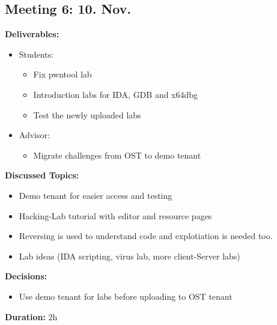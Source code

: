 \newpage
\subsection*{Meeting 6: 10. Nov.}
\textbf{Deliverables:}
\begin{itemize}
    \item Students:
    \begin{itemize}
        \item Fix pwntool lab
        \item Introduction labs for IDA, GDB and x64dbg
        \item Test the newly uploaded labs
    \end{itemize}
    \item Advisor:
    \begin{itemize}
        \item Migrate challenges from OST to demo tenant
    \end{itemize}
\end{itemize} 
\textbf{Discussed Topics:}
\begin{itemize}
    \item Demo tenant for easier access and testing
    \item Hacking-Lab tutorial with editor and resource pages
    \item Reversing is used to understand code and explotiation is needed too.
    \item Lab ideas (IDA scripting, virus lab, more client-Server labs)
\end{itemize}
\textbf{Decisions:}
\begin{itemize}
    \item Use demo tenant for labs before uploading to OST tenant    
\end{itemize}
\textbf{Duration:} 2h

\newpage
